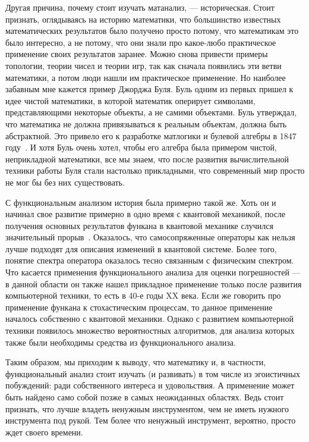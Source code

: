 \documentclass[russian]{article}
\begin{document}
Другая причина, почему стоит изучать матанализ, --- историческая. Стоит признать, оглядываясь на историю математики, что большинство известных математических результатов было получено просто потому, что математикам это было интересно, а не потому, что они знали про какое-любо практическое применение своих результатов заранее. Можно снова привести примеры топологии, теории чисел и теории игр, так как сначала появились эти ветви математики, а потом люди нашли им практическое применение. Но наиболее забавным мне кажется пример Джорджа Буля. Буль одним из первых пришел к идее чистой математики, в которой математик оперирует символами, представляющими некоторые объекты, а не самими объектами. Буль утверждал, что математика не должна привязываться к реальным объектам, должна быть абстрактной. Это привело его к разработке матлогики и булевой алгебры в 1847 году~\cite{boole}. И хотя Буль очень хотел, чтобы его алгебра была примером чистой, неприкладной математики, все мы знаем, что после развития вычислительной техники работы Буля стали настолько прикладными, что современный мир просто не мог бы без них существовать.

С функциональным анализом история была примерно такой же. Хоть он и начинал свое развитие примерно в одно время с квантовой механикой, после получения основных результатов функана в квантовой механике случился значительный прорыв~\cite{quantum}. Оказалось, что самосопряженные операторы как нельзя лучше подходят для описания изменений в квантовой системе. Более того, понятие спектра оператора оказалось тесно связанным с физическим спектром.
Что касается применения функционального анализа для оценки погрешностей --- в данной области он также нашел прикладное применение только после развития компьютерной техники, то есть в 40-е годы XX века. Если же говорить про применение функана к стохастическим процессам, то данное применение началось собственно с квантовой механики. Однако с развитием компьютерной техники появилось множество вероятностных алгоритмов, для анализа которых также были необходимы средства из функционального анализа.

Таким образом, мы приходим к выводу, что математику и, в частности, функциональный анализ стоит изучать (и развивать) в том числе из эгоистичных побуждений: ради собственного интереса и удовольствия. А применение может быть найдено само собой позже в самых неожиданных областях. Ведь стоит признать, что лучше владеть ненужным инструментом, чем не иметь нужного инструмента под рукой. Тем более что ненужный инструмент, вероятно, просто ждет своего времени.
\end{document}

